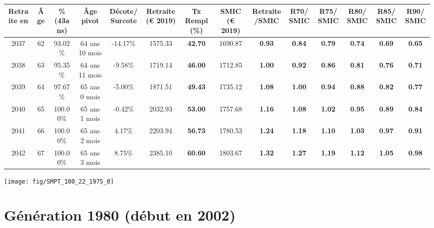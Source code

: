 \begin{adjustbox}{max width=\textwidth} 
\begin{tabular}[htb]{|c|c||c|c|c||c|c||c|c||c|c|c|c|c|} 
\hline 
 Retraite en &  Âge &  \%(43ans) &  Âge pivot &  Décote/Surcote &  Retraite (\euro{} 2019) &  Tx Rempl(\%) &  SMIC (\euro{} 2019) &  Retraite/SMIC &  R70/SMIC &  R75/SMIC &  R80/SMIC &  R85/SMIC &  R90/SMIC \\ 
\hline \hline 
 2037 &  62 &  93.02\% &  64 ans 10 mois &  -14.17\% &  1575.33 &  {\bf 42.70} &  1690.87 &  {\bf {\color{red} 0.93}} &  {\bf {\color{red} 0.84}} &  {\bf {\color{red} 0.79}} &  {\bf {\color{red} 0.74}} &  {\bf {\color{red} 0.69}} &  {\bf {\color{red} 0.65}} \\ 
\hline 
 2038 &  63 &  95.35\% &  64 ans 11 mois &  -9.58\% &  1719.14 &  {\bf 46.00} &  1712.85 &  {\bf 1.00} &  {\bf {\color{red} 0.92}} &  {\bf {\color{red} 0.86}} &  {\bf {\color{red} 0.81}} &  {\bf {\color{red} 0.76}} &  {\bf {\color{red} 0.71}} \\ 
\hline 
 2039 &  64 &  97.67\% &  65 ans 0 mois &  -5.00\% &  1871.51 &  {\bf 49.43} &  1735.12 &  {\bf 1.08} &  {\bf {\color{red} 1.00}} &  {\bf {\color{red} 0.94}} &  {\bf {\color{red} 0.88}} &  {\bf {\color{red} 0.82}} &  {\bf {\color{red} 0.77}} \\ 
\hline 
 2040 &  65 &  100.00\% &  65 ans 1 mois &  -0.42\% &  2032.93 &  {\bf 53.00} &  1757.68 &  {\bf 1.16} &  {\bf 1.08} &  {\bf 1.02} &  {\bf {\color{red} 0.95}} &  {\bf {\color{red} 0.89}} &  {\bf {\color{red} 0.84}} \\ 
\hline 
 2041 &  66 &  100.00\% &  65 ans 2 mois &  4.17\% &  2203.94 &  {\bf 56.73} &  1780.53 &  {\bf 1.24} &  {\bf 1.18} &  {\bf 1.10} &  {\bf 1.03} &  {\bf {\color{red} 0.97}} &  {\bf {\color{red} 0.91}} \\ 
\hline 
 2042 &  67 &  100.00\% &  65 ans 3 mois &  8.75\% &  2385.10 &  {\bf 60.60} &  1803.67 &  {\bf 1.32} &  {\bf 1.27} &  {\bf 1.19} &  {\bf 1.12} &  {\bf 1.05} &  {\bf {\color{red} 0.98}} \\ 
\hline 
\hline 
\end{tabular} 
\end{adjustbox} 
 
 \vspace{0.1cm} 

 {\hspace{-2.2cm}\texttt{[image: fig/SMPT\_100\_22\_1975\_0]}} 

\newpage 
 
\section{Génération 1980 (début en 2002)\label{SMPT_100_22_1980_0}} 
 
